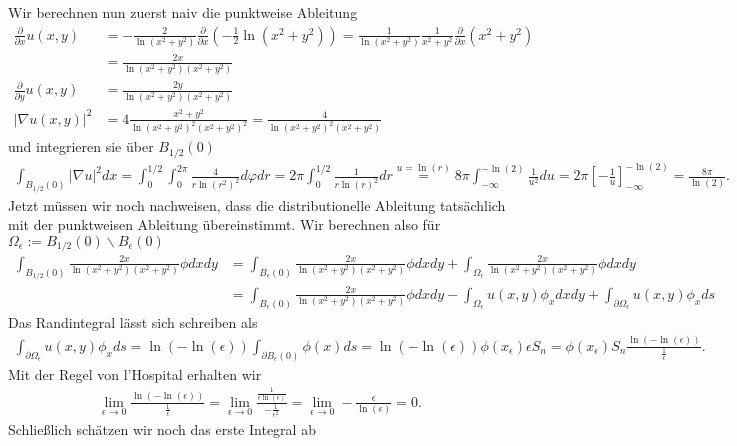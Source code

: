 \begin{solution}
Wir berechnen nun zuerst naiv die punktweise Ableitung
\begin{align*}
  \frac{\partial}{\partial x} u(x,y) &= -\frac{2}{\ln(x^2+y^2)}
  \frac{\partial}{\partial x}(-\frac{1}{2}\ln(x^2+y^2)) =
  \frac{1}{\ln(x^2+y^2)}\frac{1}{x^2+y^2}\frac{\partial}{\partial x}(x^2+y^2) \\
  &= \frac{2x}{\ln(x^2+y^2)(x^2+y^2)} \\
  \frac{\partial}{\partial y} u(x,y) &= \frac{2y}{\ln(x^2+y^2)(x^2+y^2)} \\
  |\nabla u(x,y)|^2 &= 4\frac{x^2+y^2}{\ln(x^2+y^2)^2(x^2+y^2)^2} = \frac{4}{\ln(x^2+y^2)^2(x^2+y^2)}
\end{align*}
und integrieren sie über $B_{1/2}(0)$
\begin{align*}
  \int_{B_{1/2}(0)}|\nabla u|^2 dx = \int_0^{1/2}\int_0^{2\pi}\frac{4}{r\ln(r^2)^2} d\varphi dr
= 2\pi\int_0^{1/2}\frac{1}{r\ln(r)^2} dr
\stackrel{u = \ln(r)}{=} 8\pi \int_{-\infty}^{-\ln(2)} \frac{1}{u^2} du
  = 2\pi[-\frac{1}{u}]_{-\infty}^{-\ln(2)} = \frac{8\pi}{\ln(2)}.
\end{align*}
Jetzt müssen wir noch nachweisen, dass die distributionelle Ableitung
tatsächlich mit der punktweisen Ableitung übereinstimmt.
Wir berechnen also für $\Omega_\epsilon := B_{1/2}(0)\backslash B_\epsilon(0)$
\begin{align*}
  \int_{B_{1/2}(0)}\frac{2x}{\ln(x^2+y^2)(x^2+y^2)}\phi dxdy &=
  \int_{B_\epsilon(0)}\frac{2x}{\ln(x^2+y^2)(x^2+y^2)}\phi dxdy
  + \int_{\Omega_\epsilon}\frac{2x}{\ln(x^2+y^2)(x^2+y^2)}\phi dxdy \\
  &= \int_{B_\epsilon(0)}\frac{2x}{\ln(x^2+y^2)(x^2+y^2)}\phi dxdy
  - \int_{\Omega_\epsilon}u(x,y)\phi_x dxdy +
  \int_{\partial \Omega_\epsilon}u(x,y)\phi_x ds
\end{align*}
Das Randintegral lässt sich schreiben  als
\begin{align*}
  \int_{\partial \Omega_\epsilon}u(x,y)\phi_x ds
  = \ln(-\ln(\epsilon))\int_{\partial B_\epsilon(0)}\phi(x) ds = \ln(-\ln(\epsilon))\phi(x_\epsilon)\epsilon S_n
  = \phi(x_\epsilon)S_n\frac{\ln(-\ln(\epsilon))}{\frac{1}{\epsilon}}.
\end{align*}
Mit der Regel von l'Hospital erhalten wir
\begin{align*}
  \lim_{\epsilon \to 0}\frac{\ln(-\ln(\epsilon))}{\frac{1}{\epsilon}}
  = \lim_{\epsilon \to 0}\frac{\frac{1}{\epsilon\ln(\epsilon)}}{-\frac{1}{\epsilon^2}}
  = \lim_{\epsilon \to 0}-\frac{\epsilon}{\ln(\epsilon)} = 0.
\end{align*}
Schließlich schätzen wir noch das erste Integral ab

\end{solution}

